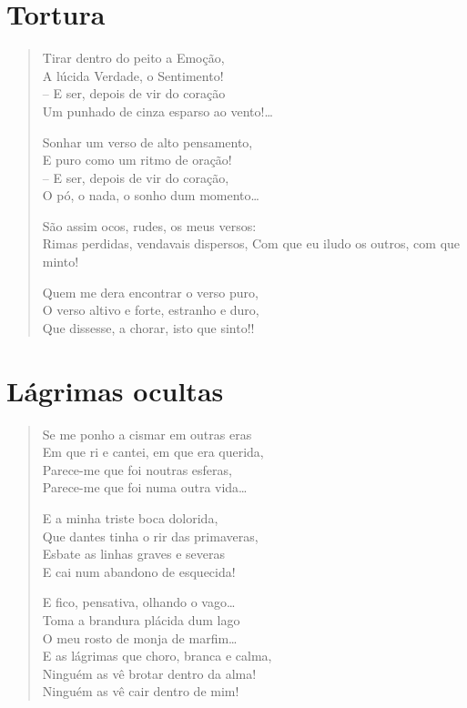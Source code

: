 \chapter{Tortura}

\begin{verse}
Tirar dentro do peito a Emoção,\\
A lúcida Verdade, o Sentimento!\\
– E ser, depois de vir do coração\\
Um punhado de cinza esparso ao vento!\ldots{}

Sonhar um verso de alto pensamento,\\
E puro como um ritmo de oração!\\
– E ser, depois de vir do coração,\\
O pó, o nada, o sonho dum momento\ldots{}

São assim ocos, rudes, os meus versos:\\
Rimas perdidas, vendavais dispersos,
Com que eu iludo os outros, com que minto!

Quem me dera encontrar o verso puro,\\
O verso altivo e forte, estranho e duro,\\
Que dissesse, a chorar, isto que sinto!!
\end{verse}

\chapter{Lágrimas ocultas}

\begin{verse}
Se me ponho a cismar em outras eras\\
Em que ri e cantei, em que era querida,\\
Parece-me que foi noutras esferas,\\
Parece-me que foi numa outra vida\ldots{}

E a minha triste boca dolorida,\\
Que dantes tinha o rir das primaveras,\\
Esbate as linhas graves e severas\\
E cai num abandono de esquecida!

E fico, pensativa, olhando o vago\ldots{}\\
Toma a brandura plácida dum lago\\
O meu rosto de monja de marfim\ldots{}\\

E as lágrimas que choro, branca e calma,\\
Ninguém as vê brotar dentro da alma!\\
Ninguém as vê cair dentro de mim!
\end{verse}

